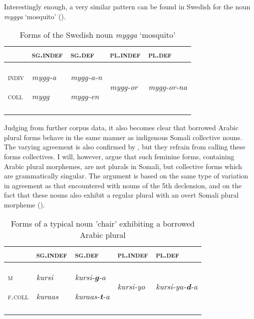 \documentclass[output=paper]{langsci/langscibook}
\begin{document}
Interestingly enough, a very similar pattern can be found in Swedish for the noun \textit{mygga} ‘mosquito’ ().\textit{} 


\begin{table}
\caption{Forms of the Swedish noun \textit{mygga} ‘mosquito’}
\label{tab:nilsson:11}
\begin{tabularx}{\textwidth}{XXXXX} 
\lsptoprule
& {\textsc{sg.indef}} & {\textsc{sg.def}} & {\textsc{pl.indef}} & {\textsc{pl.def}}\\
\midrule
{\textsc{indiv}}

{\textsc{coll}} & {\textit{mygg-a}}

{\textit{mygg}} & {\textit{mygg-a-n}}

{\textit{mygg-en}} & {\textit{mygg-or}} & {\textit{mygg-or-na}}\\
\lspbottomrule
\end{tabularx}

\end{table} 



Judging from further corpus data, it also becomes clear that borrowed Arabic plural forms behave in the same manner as indigenous Somali collective nouns. The varying agreement is also confirmed by \citet[86]{Siyaad1984}, but they refrain from calling these forms collectives. I will, however, argue that such feminine forms, containing Arabic plural morphemes, are not plurals in Somali, but collective forms which are grammatically singular. The argument is based on the same type of variation in agreement as that encountered with nouns of the 5th declension, and on the fact that these nouns also exhibit a regular plural with an overt Somali plural morpheme ().
 
\begin{table}
\caption{Forms of a typical noun 'chair' exhibiting a borrowed Arabic plural}
\label{tab:nilsson:12}
\begin{tabularx}{\textwidth}{XXXXX}
\lsptoprule
 & {\textsc{sg.indef}} & {\textsc{sg.def}} & {\textsc{pl.indef}} & {\textsc{pl.def}}\\
\midrule
{\textsc{m}}

{\textsc{f.coll}} & {\textit{kursi}}

{\textit{kuraas}} & {\textit{kursi-}\textbf{\textit{g}}\textit{-a}}

{\textit{kuraas-}\textbf{\textit{t}}\textit{-a}} & {\textit{kursi-yo}} & {\textit{kursi-ya-}\textbf{\textit{d}}\textit{-a}}\\
\lspbottomrule
\end{tabularx}

\end{table} 
\end{document}
